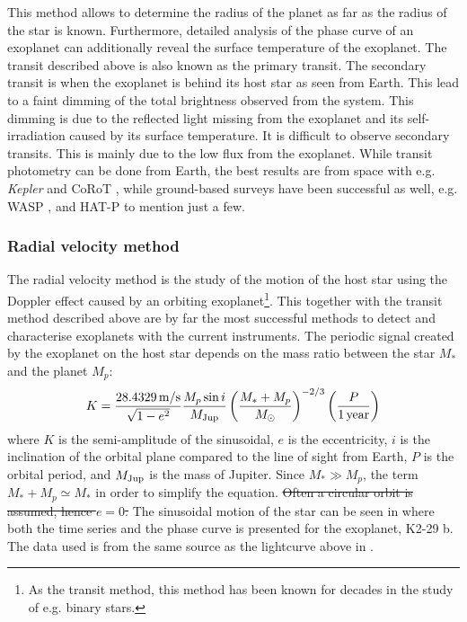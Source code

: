 This method allows to determine the radius of the planet as far as the radius of the star is known.
Furthermore, detailed analysis of the phase curve of an exoplanet can additionally reveal the
surface temperature of the exoplanet. The transit described above is also known as the primary
transit. The secondary transit is when the exoplanet is behind its host star as seen from Earth.
This lead to a faint dimming of the total brightness observed from the system. This dimming is due
to the reflected light missing from the exoplanet and its self-irradiation caused by its surface
temperature. It is difficult to observe secondary transits. This is mainly due to the low flux from
the exoplanet. While transit photometry can be done from Earth, the best results are from space with
e.g. \emph{Kepler} \citep{Borucki2010} and CoRoT \citep{Baglin2006}, while ground-based surveys have
been successful as well, e.g. WASP \citep{Pollacco2006}, and HAT-P \citep{Bakos2004} to mention
just a few.



\subsubsection{Radial velocity method}
\label{sec:rvmethod}

The radial velocity method is the study of the motion of the host star using the Doppler effect
caused by an orbiting exoplanet\footnote{As the transit method, this method has been known for
decades in the study of e.g. binary stars.}. This together with the transit method described above
are by far the most successful methods to detect and characterise exoplanets  with the current
instruments. The periodic signal created by the exoplanet on the host star depends on the mass ratio
between the star $M_\ast$ and the planet $M_p$:
\begin{align}
  K = \frac{\SI{28.4329}{m/s}}{\sqrt{1-e^2}} \frac{M_p\sin i}{M_\mathrm{Jup}} \left( \frac{M_\ast+M_p}{M_\odot} \right)^{-2/3} \left(\frac{P}{\SI{1}{year}}\right)  \label{eq:rv}
\end{align}
where $K$ is the semi-amplitude of the sinusoidal, $e$ is the eccentricity, $i$ is the inclination
of the orbital plane compared to the line of sight from Earth, $P$ is the orbital period, and
$M_\mathrm{Jup}$ is the mass of Jupiter. Since $M_\ast \gg M_p$, the term $M_\ast+M_p\simeq M_\ast$ in order
to simplify the equation. \st{Often a circular orbit is assumed, hence $e=0$.} The sinusoidal motion
of the star can be seen in  where both the time series and the phase curve is
presented for the exoplanet, K2-29 b. The data used is from the same source as the lightcurve above
in .

